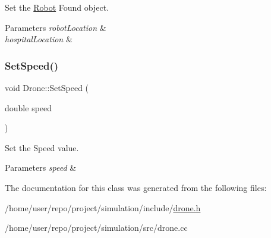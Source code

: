Set the \hyperlink{classRobot}{Robot} Found object. 


\begin{DoxyParams}{Parameters}
{\em robot\+Location} & \\
\hline
{\em hospital\+Location} & \\
\hline
\end{DoxyParams}
\mbox{\label{classDrone_af8cb12a403cf56145000f247689d0951}} 
\subsubsection{\texorpdfstring{Set\+Speed()}{SetSpeed()}}
{\footnotesize\ttfamily void Drone\+::\+Set\+Speed (\begin{DoxyParamCaption}\item[{double}]{speed }\end{DoxyParamCaption})\hspace{0.3cm}{\ttfamily [inline]}}



Set the Speed value. 


\begin{DoxyParams}{Parameters}
{\em speed} & \\
\hline
\end{DoxyParams}


The documentation for this class was generated from the following files\+:\begin{DoxyCompactItemize}
\item 
/home/user/repo/project/simulation/include/\hyperlink{drone_8h}{drone.\+h}\item 
/home/user/repo/project/simulation/src/drone.\+cc\end{DoxyCompactItemize}
